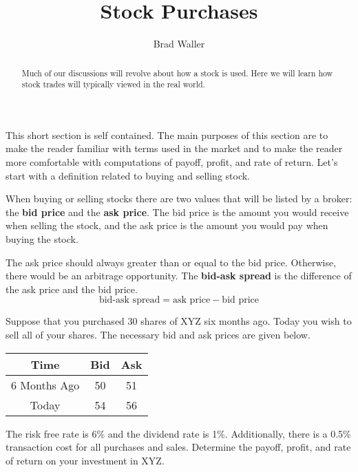 \documentclass{ximera}
\author{Brad Waller}
\title{Stock Purchases}
\begin{document}
\begin{abstract}
Much of our discussions will revolve about how a stock is used. Here we will learn how stock trades will typically viewed in the real world.
\end{abstract}

\maketitle

This short section is self contained. The main purposes of this section are to make the reader familiar with terms used in the market and to make the reader more comfortable with computations of payoff, profit, and rate of return. Let's start with a definition related to buying and selling stock.
\begin{definition}
When buying or selling stocks there are two values that will be listed by a broker: the {\bf bid price} and the {\bf ask price}. The bid price is the amount you would receive when selling the stock, and the ask price is the amount you would pay when buying the stock.
\end{definition}

\begin{remark}
The ask price should always greater than or equal to the bid price. Otherwise, there would be an arbitrage opportunity. The {\bf bid-ask spread} is the difference of the ask price and the bid price.
\begin{equation*}
\text{bid-ask spread}=\text{ask price}-\text{bid price}
\end{equation*}
\end{remark}

\begin{example}
Suppose that you purchased 30 shares of XYZ six months ago. Today you wish to sell all of your shares. The necessary bid and ask prices are given below.
	\begin{center}
		\begin{tabular}{c|cc}
		Time & Bid & Ask\\
		\hline
		6 Months Ago & 50 & 51\\
		Today & 54 & 56
		\end{tabular}
	\end{center}
The risk free rate is 6\% and the dividend rate is 1\%. Additionally, there is a 0.5\% transaction cost for all purchases and sales. Determine the payoff, profit, and rate of return on your investment in XYZ.
\end{example}
\end{document}
